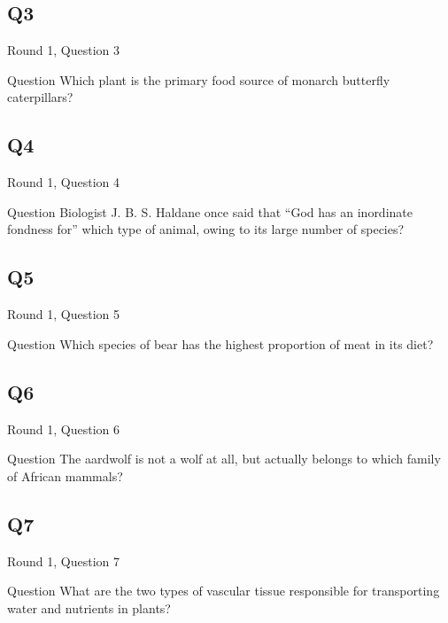 \documentclass[11pt]{beamer}
\begin{document}
\subsection*{Q3}
\begin{frame}[t]{Round 1, Question 3}
\begin{block}{Question}
Which plant is the primary food source of monarch butterfly caterpillars?
\end{block}
\end{frame}
\subsection*{Q4}
\begin{frame}[t]{Round 1, Question 4}
\begin{block}{Question}
Biologist J. B. S. Haldane once said that ``God has an inordinate fondness for'' which type of animal, owing to its large number of species?
\end{block}
\end{frame}
\subsection*{Q5}
\begin{frame}[t]{Round 1, Question 5}
\begin{block}{Question}
Which species of bear has the highest proportion of meat in its diet?
\end{block}
\end{frame}
\subsection*{Q6}
\begin{frame}[t]{Round 1, Question 6}
\begin{block}{Question}
The aardwolf is not a wolf at all, but actually belongs to which family of African mammals?
\end{block}
\end{frame}
\subsection*{Q7}
\begin{frame}[t]{Round 1, Question 7}
\begin{block}{Question}
What are the two types of vascular tissue responsible for transporting water and nutrients in plants?
\end{block}
\end{frame}
\end{document}
